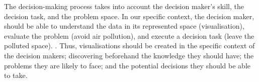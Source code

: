 The decision-making process takes into account the decision maker's skill, the decision task, and the problem space. In our specific context, the decision maker, should be able to understand the data in its represented space (visualisation), evaluate the problem (avoid air pollution), and execute a decision task (leave the polluted space).  \cite{Zhu2008}. Thus, visualisations should be created in the specific context of the decision makers; discovering beforehand the knowledge they should have; the problems they are likely to face; and the potential decisions they should be able to take. 
